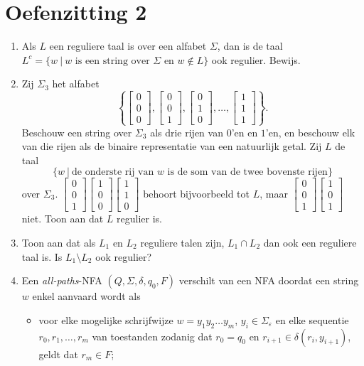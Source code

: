 \documentclass[a4paper]{article}
\newcommand{\kolom}[1]{ \left[ \begin{array}{c} #1 \end{array} \right] }
\begin{document}
\section*{Oefenzitting 2}
	\begin{enumerate}
		\item Als $L$ een reguliere taal is over een alfabet $\Sigma$, dan is de taal $L^c = \{ w \ | \ \mbox{$w$  is een string over $\Sigma$ en $w \not\in L$} \}$ ook regulier. Bewijs.   %
		\item Zij $\Sigma_3$ het alfabet 
				{\tiny
					\[ \left\{ \kolom{ 0 \\ 0 \\ 0}, \kolom{ 0 \\ 0 \\ 1}, \kolom{ 0 \\ 1 \\ 0}, \ldots, \kolom{ 1 \\ 1 \\ 1} \right\}. \]
				}
				Beschouw een string over $\Sigma_3$ als drie rijen van $0$'en en $1$'en, en beschouw elk van die rijen als de binaire representatie van een natuurlijk getal. Zij $L$ de taal 
				\[ \{ w \ | \ \mbox{de onderste rij van $w$ is de som van de twee bovenste rijen} \} \]
				over $\Sigma_3$. {\tiny $\kolom{ 0 \\ 0 \\ 1} \kolom{ 1 \\ 0 \\ 0} \kolom{ 1 \\ 1 \\ 0}$} behoort bijvoorbeeld tot $L$, maar { \tiny $\kolom{ 0 \\0 \\ 1} \kolom{ 1 \\ 0 \\ 1}$} niet. Toon aan dat $L$ regulier is.
		\item Toon aan dat als $L_1$ en $L_2$ reguliere talen zijn, $L_1 \cap L_2$ dan ook een reguliere taal is. Is $L_1 \setminus L_2$ ook regulier?
		\item Een \emph{all-paths}-NFA $(Q,\Sigma,\delta,q_0,F)$ verschilt van een NFA doordat een string $w$ enkel aanvaard wordt als 
				\begin{itemize}
					\item voor elke mogelijke schrijfwijze $w = y_1 y_2 \ldots y_m$, $y_i \in \Sigma_{\varepsilon}$ en elke sequentie $r_0, r_1, \ldots, r_m$ van toestanden zodanig dat $r_0 = q_0$ en $r_{i+1} \in \delta(r_i,y_{i+1})$, geldt dat $r_m \in F$;

\end{itemize}
\end{enumerate}
\end{document}

